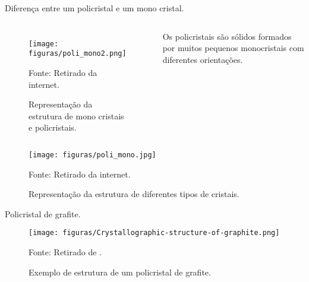\begin{frame}{Diferença entre um policristal e um mono cristal.}

    \begin{columns}[c]
      

        \begin{figure}
          \centering
          \caption{Representação da estrutura de mono cristais e policristais.}
          \texttt{[image: figuras/poli\_mono2.png]}\par
          {\scriptsize Fonte: Retirado da internet.}
        \end{figure}

        Os policristais são sólidos formados por muitos pequenos monocristais com diferentes
orientações.

    \end{columns}

    
\end{frame}

\begin{frame}

        \begin{center}
        \begin{figure}
          \caption{Representação da estrutura de diferentes tipos de cristais.}
        \texttt{[image: figuras/poli\_mono.jpg]}\par
          {\scriptsize Fonte: Retirado da internet.}
        \end{figure}
        \end{center}



    
\end{frame}

\begin{frame}{Policristal de grafite.}

        \begin{center}
        \begin{figure}
        \caption{Exemplo de estrutura de um policristal de grafite.}
        \vspace*{-0.25cm}
        \texttt{[image: figuras/Crystallographic-structure-of-graphite.png]}\par
        {\scriptsize Fonte: Retirado de \cite{STEFANESCU2016102}.}
        \end{figure}
        \end{center}
    
\end{frame}


